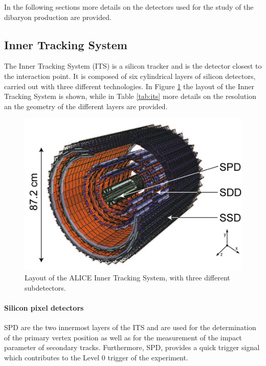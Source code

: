 In the following sections more details on the detectors used for the study of the \dst dibaryon
production are provided.


%
\subsection{Inner Tracking System} \label{sec:its}

The Inner Tracking System (ITS) \cite{alicemulti,alice:Perf2014} is a silicon tracker and is the
detector closest to the interaction point.
It is composed of six cylindrical layers of silicon detectors, carried out with three different
technologies.
In Figure \ref{fig:its} the layout of the Inner Tracking System is shown, while in Table \ref{tab:its}
more details on the resolution an the geometry of the different layers are provided.

\begin{figure}
    \centering
    \includegraphics[width=0.7 \textwidth]{gfx/its}
	\caption{Layout of the ALICE Inner Tracking System, with three different subdetectors.}
	\label{fig:its}
\end{figure}

\paragraph{Silicon pixel detectors} 
SPD are the two innermost layers of the ITS and are
used for the determination of the primary vertex position as well as for the measurement of
the impact parameter of secondary tracks.
Furthermore, SPD, provides a quick trigger signal which contributes to the Level 0 trigger of 
the experiment.

